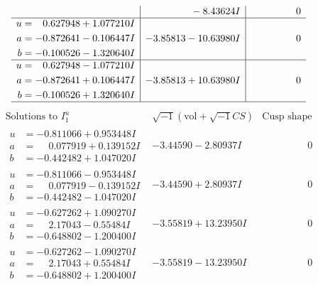 \documentclass[1p]{elsarticle_modified}
\theoremstyle{definition}
\newcommand{\I}{\sqrt{-1}}
\begin{document}
$$\begin{array}{c|c|c}
 & \phantom{-0.000000 } -8.43624 I & \phantom{-0.000000 } 0 \\ \hline\begin{aligned}
u &= \phantom{-}0.627948 + 1.077210 I \\
a &= -0.872641 - 0.106447 I \\
b &= -0.100526 - 1.320640 I\end{aligned}
 & -3.85813 - 10.63980 I & \phantom{-0.000000 } 0 \\ \hline\begin{aligned}
u &= \phantom{-}0.627948 - 1.077210 I \\
a &= -0.872641 + 0.106447 I \\
b &= -0.100526 + 1.320640 I\end{aligned}
 & -3.85813 + 10.63980 I & \phantom{-0.000000 } 0\\
 \hline 
 \end{array}$$\newpage$$\begin{array}{c|c|c}  
\text{Solutions to }I^u_{1}& \I (\text{vol} + \sqrt{-1}CS) & \text{Cusp shape}\\
 \hline 
\begin{aligned}
u &= -0.811066 + 0.953448 I \\
a &= \phantom{-}0.077919 + 0.139152 I \\
b &= -0.442482 + 1.047020 I\end{aligned}
 & -3.44590 - 2.80937 I & \phantom{-0.000000 } 0 \\ \hline\begin{aligned}
u &= -0.811066 - 0.953448 I \\
a &= \phantom{-}0.077919 - 0.139152 I \\
b &= -0.442482 - 1.047020 I\end{aligned}
 & -3.44590 + 2.80937 I & \phantom{-0.000000 } 0 \\ \hline\begin{aligned}
u &= -0.627262 + 1.090270 I \\
a &= \phantom{-}2.17043 - 0.55484 I \\
b &= -0.648802 - 1.200400 I\end{aligned}
 & -3.55819 + 13.23950 I & \phantom{-0.000000 } 0 \\ \hline\begin{aligned}
u &= -0.627262 - 1.090270 I \\
a &= \phantom{-}2.17043 + 0.55484 I \\
b &= -0.648802 + 1.200400 I\end{aligned}
 & -3.55819 - 13.23950 I & \phantom{-0.000000 } 0 \\ \hline\begin{aligned}

\end{aligned}
\end{array}$$
\end{document}
